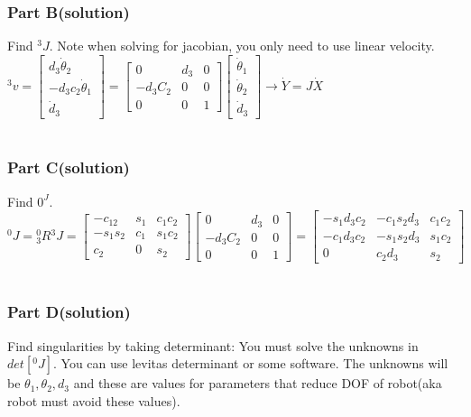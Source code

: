 \documentclass{article}
\begin{document}
\subsubsection{Part B(solution)}
Find ${}^3J$. Note when solving for jacobian, you only need to use linear velocity. \\
${}^3v=\begin{bmatrix}
    d_3\dot{\theta}_2\\
    -d_3c_2\dot{\theta}_1\\
    \dot{d}_3
\end{bmatrix}=\begin{bmatrix}
0 & d_3 & 0\\
-d_3C_2 & 0 & 0\\
0 & 0 & 1
\end{bmatrix}\begin{bmatrix}
\dot{\theta}_1\\
\dot{\theta}_2\\
\dot{d}_3
\end{bmatrix} \rightarrow \dot{Y}=J\dot{X}$\\\\

\subsubsection{Part C(solution)}
Find ${}0^J$. \\
${}^0J={}^0_3R {}^3J=\begin{bmatrix}
-c_{12} & s_1 & c_1c_2\\
-s_1s_2 & c_1 & s_1c_2\\
c_2 & 0 & s_2
\end{bmatrix}
\begin{bmatrix}
0 & d_3 & 0\\
-d_3C_2 & 0 & 0\\
0 & 0 & 1
\end{bmatrix}=\begin{bmatrix}
-s_1d_3c_2 & -c_1s_2d_3 & c_1c_2\\
-c_1d_3c_2 & -s_1s_2d_3 & s_1c_2\\
0 & c_2d_3 & s_2
\end{bmatrix}$\\\\
\subsubsection{Part D(solution)}
Find singularities by taking determinant: You must solve the unknowns in $det[{}^0J]$. You can use levitas determinant or some software. The unknowns will be $\theta_1, \theta_2, d_3$ and these are values for parameters that reduce DOF of robot(aka robot must avoid these values).
\end{document}
